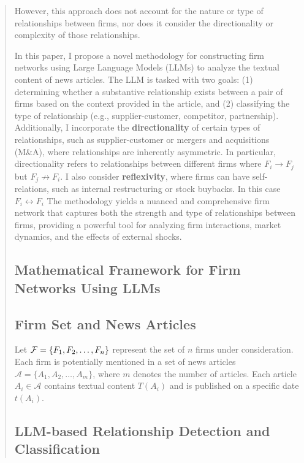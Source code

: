 \begin{quote}
\begin{quote}
\end{quote}




However, this approach does not account for the nature or type of relationships between firms, nor does it consider the directionality or complexity of those relationships.

In this paper, I propose a novel methodology for constructing firm networks using Large Language Models (LLMs) to analyze the textual content of news articles. The LLM is tasked with two goals: (1) determining whether a substantive relationship exists between a pair of firms based on the context provided in the article, and (2) classifying the type of relationship (e.g., supplier-customer, competitor, partnership). Additionally, I incorporate the \textbf{directionality} of certain types of relationships, such as supplier-customer or mergers and acquisitions (M\&A), where relationships are inherently asymmetric. In particular, directionality refers to relationships between different firms where $F_i \rightarrow F_j$ but $F_j \not \rightarrow F_i$. I also consider \textbf{reflexivity}, where firms can have self-relations, such as internal restructuring or stock buybacks. In this case $F_i \leftrightarrow F_i$
The methodology yields a nuanced and comprehensive firm network that captures both the strength and type of relationships between firms, providing a powerful tool for analyzing firm interactions, market dynamics, and the effects of external shocks.

\subsection{Mathematical Framework for Firm Networks Using LLMs}

\subsection{Firm Set and News Articles}

Let $ \mathcal{F} = \{F_1, F_2, \dots, F_n\} $ represent the set of $ n $ firms under consideration. Each firm is potentially mentioned in a set of news articles $ \mathcal{A} = \{A_1, A_2, \dots, A_m\} $, where $ m $ denotes the number of articles. Each article $ A_i \in \mathcal{A} $ contains textual content $ T(A_i) $ and is published on a specific date $ t(A_i) $.

\subsection{LLM-based Relationship Detection and Classification}


\end{quote}
